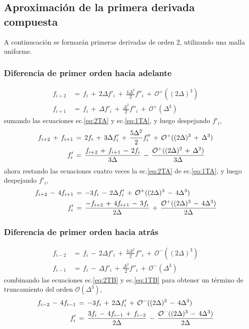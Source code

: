 \documentclass[9pt,technote,twoside,letterpaper,twocolumn]{IEEEtran}
\begin{document}
\subsection{Aproximación de la primera derivada compuesta}
\label{sec:primdercompu}
A continucación se formarán primeras derivadas de orden 2, utilizando una malla uniforme.

\subsubsection{Diferencia de primer orden hacia adelante}
\label{sec:dif1D2Oa}
\begin{align}
  f_{i+2}&\,=\,f_i\,+\,2\Delta f'_i\,+\,\frac{4\Delta^2}{2}f''_i\,+\,\mathcal{O}^+((2\Delta)^3)  
  \label{eq:2TA}\\
  f_{i+1}&\,=\,f_i\,+\,\Delta f'_i\,+\,\frac{\Delta^2}{2}f''_i\,+\,\mathcal{O}^+(\Delta^3)  
  \label{eq:1TA}
\end{align}
sumando las ecuaciones ec.\ref{eq:2TA} y ec.\ref{eq:1TA}, y luego despejando $f'_i$,
\begin{align}
  f_{i+2}\,+\,f_{i+1}&\,=\,2f_i\,+\,3\Delta f'_i\,+\,\frac{5\Delta^2}{2}f''_i\,+\,\mathcal{O}^+((2\Delta)^3\,+\,\Delta^3)\notag\\
  f'_i&\,=\,\frac{f_{i+2}\,+\,f_{i+1}\,-\,2f_i}{3\Delta}\,-\,\frac{\mathcal{O}^+((2\Delta)^2\,+\,\Delta^2)}{3\Delta}
    \label{eq:2ordA}
\end{align}
ahora restando las ecuaciones cuatro veces la ec.\ref{eq:2TA} de ec.\ref{eq:1TA}, y luego despejando $f'_i$,
\begin{align}
  f_{i+2}\,-\,4f_{i+1}&\,=\,-3f_i\,-\,2\Delta f'_i\,+\,\mathcal{O}^+((2\Delta)^3\,-\,4\Delta^3)\notag\\
  f'_i&\,=\,\frac{-f_{i+2}\,+\,4f_{i+1}\,-\,3f_i}{2\Delta}\,+\,\frac{\mathcal{O}^+((2\Delta)^3\,-\,4\Delta^3)}{2\Delta}
    \label{eq:2ordAO3}
\end{align}

\subsubsection{Diferencia de primer orden hacia atrás}
\label{sec:dif1D2Ob}
\begin{align}
  f_{i-2}&\,=\,f_i\,-\,2\Delta f'_i\,+\,\frac{4\Delta^2}{2}f''_i\,+\,\mathcal{O}^-((2\Delta)^3)  
  \label{eq:2TB}\\
  f_{i-1}&\,=\,f_i\,-\,\Delta f'_i\,+\,\frac{\Delta^2}{2}f''_i\,+\,\mathcal{O}^-(\Delta^3)  
  \label{eq:1TB}
\end{align}
combinando las ecuaciones ec.\ref{eq:2TB} y ec.\ref{eq:1TB} para obtener un término de truncamiento del orden $\mathcal{O}(\Delta^3)$,
\begin{align}
  f_{i-2}\,-\,4f_{i-1}&\,=\,-3f_i\,+\,2\Delta f'_i\,+\,\mathcal{O}^-((2\Delta)^3\,-\,4\Delta^3)\notag\\
  f'_i&\,=\,\frac{3f_{i}\,-\,4f_{i-1}\,+\,f_{i-2}}{2\Delta}\,-\,\frac{\mathcal{O}^-((2\Delta)^3\,-\,4\Delta^3)}{2\Delta}
    \label{eq:2ordB}
\end{align}
\end{document}
